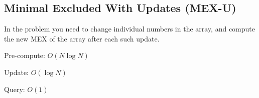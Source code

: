 \subsection{Minimal Excluded With Updates (MEX-U)}

In the problem you need to change individual numbers in the array, and compute
the new MEX of the array after each such update.

Pre-compute: $O(N \log N)$

Update: $O(\log N)$

Query: $O(1)$
